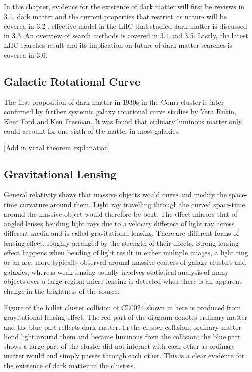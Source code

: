 In this chapter, evidence for the existence of dark matter will first be reviews in 3.1, dark matter and the current properties that restrict its nature will be covered in 3.2 , effective model in the LHC that studied dark matter is discussed in 3.3. An overview of search methods is covered in 3.4 and 3.5. Lastly, the latest LHC searches result and its implication on future of dark matter searches is covered in 3.6. 


\subsection{Galactic Rotational Curve}
The first proposition of dark matter in 1930s in the Coma cluster is later confirmed by further systemic galaxy rotational curve studies by Vera Rubin, Kent Ford and Ken Freeman. It was found that ordinary luminous matter only could account for one-sixth of the matter in most galaxies. 

[Add in virial theorem explanation]

\subsection{Gravitational Lensing}

General relativity shows that massive objects would curve and modify the space-time curvature around them. Light ray travelling through the curved space-time around the massive object would therefore be bent. The effect mirrors that of angled lenses bending light rays due to a velocity differece of light ray across different media and is called gravitational lensing. There are different forms of lensing effect, roughly arranged by the strength of their effects. Strong lensing
effect happens when bending of light result in either multiple images, a light ring or an arc, more typically observed around massive centers of galaxy clusters and galaxies; whereas weak lensing usually involves statistical analysis of many objects over a large region; micro-lensing is detected when there is an apparent change in the brightness of the source.


Figure of the bullet cluster collision of CL0024 shown in here is produced from gravitational lensing effect. The red part of the diagram denotes ordinary matter and the blue part reflects dark matter. In the cluster collision, ordinary matter bend light around them and became luminous from the collision; the blue part shows a large part of the cluster did not interact with each other as ordinary matter would and simply passes through each other. This is a clear evidence for the existence of dark matter in the clusters.

